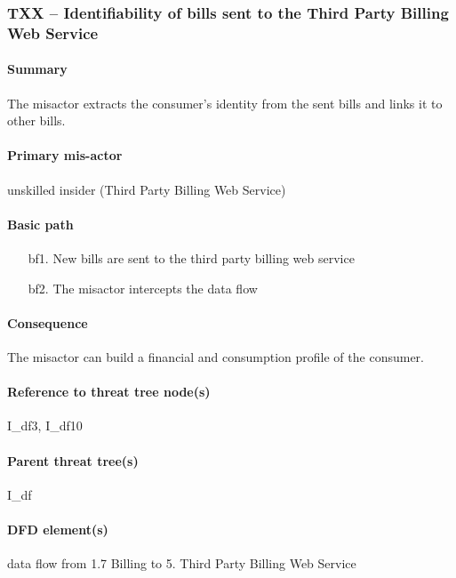 \subsubsection{TXX -- Identifiability of bills sent to the Third Party Billing
Web Service}
\paragraph{Summary} The misactor extracts the consumer's identity from the sent
bills and links it to other bills.

\paragraph{Primary mis-actor} unskilled insider (Third Party Billing Web
Service)

\paragraph{Basic path}
\begin{enumerate}
	\item[bf1.] New bills are sent to the third party billing web service
	\item[bf2.] The misactor intercepts the data flow
\end{enumerate}

\paragraph{Consequence} The misactor can build a financial and consumption
profile of the consumer. 

\paragraph{Reference to threat tree node(s)} I_df3, I_df10

\paragraph{Parent threat tree(s)} I_df

\paragraph{DFD element(s)} data flow from 1.7 Billing to 5. Third Party Billing
Web Service

